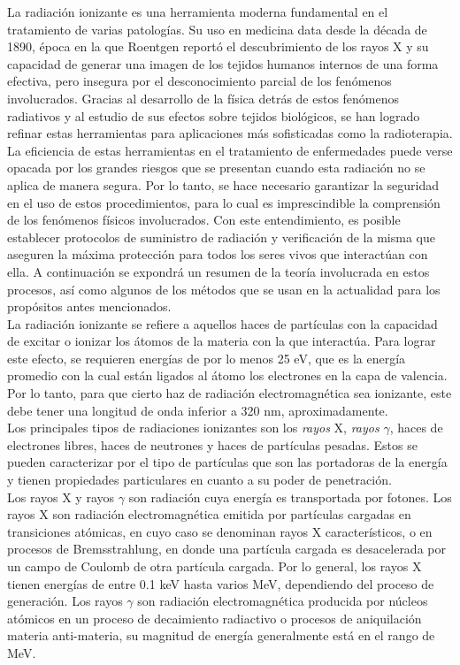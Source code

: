 La radiación ionizante es una herramienta moderna fundamental en el tratamiento de varias patologías. Su uso en medicina data desde la década de 1890, época en la que Roentgen reportó el descubrimiento de los rayos X y su capacidad de generar una imagen de los tejidos humanos internos de una forma efectiva, pero insegura por el desconocimiento parcial de los fenómenos involucrados. Gracias al desarrollo de la física detrás de estos fenómenos radiativos y al estudio de sus efectos sobre tejidos biológicos, se han logrado refinar estas herramientas para aplicaciones más sofisticadas como la radioterapia.\\

La eficiencia de estas herramientas en el tratamiento de enfermedades puede verse opacada por los grandes riesgos que se presentan cuando esta radiación no se aplica de manera segura. Por lo tanto, se hace necesario garantizar la seguridad en el uso de estos procedimientos, para lo cual es imprescindible la comprensión de los fenómenos físicos involucrados. Con este entendimiento, es posible establecer protocolos de suministro de radiación y verificación de la misma que aseguren la máxima protección para todos los seres vivos que interactúan con ella. A continuación se expondrá un resumen de la teoría involucrada en estos procesos, así como algunos de los métodos que se usan en la actualidad para los propósitos antes mencionados.  \\

La radiación ionizante se refiere a aquellos haces de partículas con la capacidad de excitar o ionizar los átomos de la materia con la que interactúa. Para lograr este efecto, se requieren energías de por lo menos 25 eV, que es la energía promedio con la cual están ligados al átomo los electrones en la capa de valencia. Por lo tanto, para que cierto haz de radiación electromagnética sea ionizante, este debe tener una longitud de onda inferior a 320 nm, aproximadamente. \\

Los principales tipos de radiaciones ionizantes son los \textit{rayos} X, \textit{rayos }$\gamma$, haces de electrones libres, haces de neutrones y haces de partículas pesadas. Estos se pueden caracterizar por el tipo de partículas que son las portadoras de la energía y tienen propiedades particulares en cuanto a su poder de penetración.\\

Los rayos X y rayos $\gamma$ son radiación cuya energía es transportada por fotones. Los rayos X son radiación electromagnética emitida por partículas cargadas en transiciones atómicas, en cuyo caso se denominan rayos X característicos, o en procesos de Bremsstrahlung, en donde una partícula cargada es desacelerada por un campo de Coulomb de otra partícula cargada. Por lo general, los rayos X tienen energías de entre  0.1 keV hasta varios MeV, dependiendo del proceso de generación. Los rayos $\gamma$ son radiación electromagnética producida por núcleos atómicos en un proceso de decaimiento radiactivo o procesos de aniquilación materia anti-materia, su magnitud de energía generalmente está en el rango de MeV.\\

